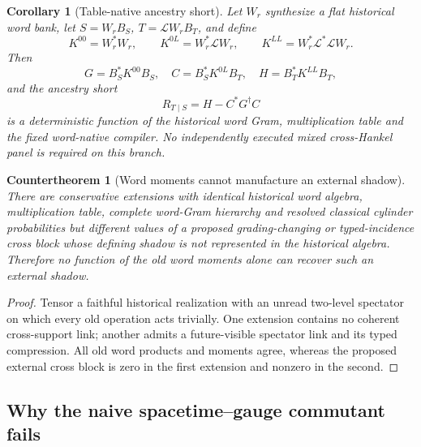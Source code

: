 \documentclass[11pt]{article}
\newtheorem{corollary}[theorem]{Corollary}
\newtheorem{countertheorem}[theorem]{Countertheorem}
\theoremstyle{definition}
\theoremstyle{remark}
\begin{document}
\begin{corollary}[Table-native ancestry short]
\label{cor:table-native-ancestry}
Let $W_r$ synthesize a flat historical word bank, let
$S=W_rB_S$, $T=\mathscr L W_rB_T$, and define
\[
 K^{00}=W_r^*W_r,\qquad
 K^{0L}=W_r^*\mathscr LW_r,\qquad
 K^{LL}=W_r^*\mathscr L^*\mathscr LW_r.
\]
Then
\begin{equation}
 \boxed{
 G=B_S^*K^{00}B_S,
 \quad C=B_S^*K^{0L}B_T,
 \quad H=B_T^*K^{LL}B_T,}
 \label{eq:table-native-GCH}
\end{equation}
and the ancestry short
\begin{equation}
 \boxed{R_{T\mid S}=H-C^*G^\dagger C}
 \label{eq:table-native-short}
\end{equation}
is a deterministic function of the historical word Gram, multiplication table
and the fixed word-native compiler.  No independently executed mixed
cross-Hankel panel is required on this branch.
\end{corollary}

\begin{countertheorem}[Word moments cannot manufacture an external shadow]
\label{thm:external-shadow-no-go}
There are conservative extensions with identical historical word algebra,
multiplication table, complete word-Gram hierarchy and resolved classical
cylinder probabilities but different values of a proposed grading-changing or
typed-incidence cross block whose defining shadow is not represented in the
historical algebra.  Therefore no function of the old word moments alone can
recover such an external shadow.
\end{countertheorem}

\begin{proof}
Tensor a faithful historical realization with an unread two-level spectator on
which every old operation acts trivially.  One extension contains no coherent
cross-support link; another admits a future-visible spectator link and its
typed compression.  All old word products and moments agree, whereas the
proposed external cross block is zero in the first extension and nonzero in the
second.
\end{proof}


\subsection{Why the naive spacetime--gauge commutant fails}
\label{sec:obstruction}
\end{document}
